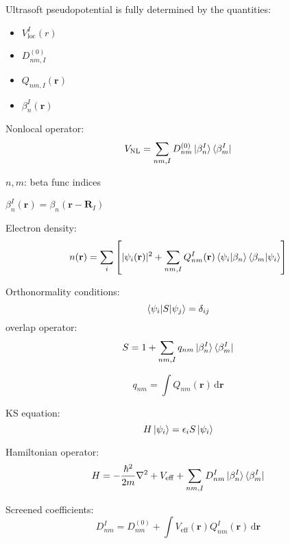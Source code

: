 \begin{frame}

Ultrasoft pseudopotential is fully determined by the quantities:
\begin{itemize}
\item $V^{I}_{\mathrm{loc}}(r)$
\item $D^{(0)}_{nm,I}$
\item $Q_{nm,I}(\mathbf{r})$
\item $\beta^{I}_{n}(\mathbf{r})$
\end{itemize}

Nonlocal operator:
\begin{equation*}
V_{\mathrm{NL}} = \sum_{nm,I} D^{(0)}_{nm} \ket{\beta^{I}_{n}}\bra{\beta^{I}_{m}}
\end{equation*}

$n,m$: beta func indices

$\beta^{I}_{n}(\mathbf{r}) = \beta_{n}(\mathbf{r} - \mathbf{R}_{I})$

Electron density:
\begin{equation*}
n(\mathbf{r}) = \sum_{i} \left[
| \psi_{i}(\mathbf{r}) |^{2} +
\sum_{nm,I} Q^{I}_{nm}(\mathbf{r}) \braket{ \psi_{i} | \beta_{n} }
\braket{ \beta_{m} | \psi_{i} }
\right]
\end{equation*}

\end{frame}


\begin{frame}

Orthonormality conditions:
\begin{equation*}
\braket{\psi_{i} | S | \psi_{j} } = \delta_{ij}
\end{equation*}
overlap operator:
\begin{equation*}
S = 1 + \sum_{nm,I} q_{nm} \ket{\beta^{I}_{n}} \bra{\beta^{I}_{m}}
\end{equation*}

\begin{equation*}
q_{nm} = \int Q_{nm}(\mathbf{r})\,\mathrm{d}\mathbf{r}
\end{equation*}

\end{frame}



\begin{frame} %

KS equation:
\begin{equation*}
H\ket{\psi_{i}} = \epsilon_{i} S \ket{\psi_{i}}
\end{equation*}

Hamiltonian operator:
\begin{equation*}
H = -\frac{\hbar^2}{2m} \nabla^2 + V_{\mathrm{eff}} +
\sum_{nm,I} D^{I}_{nm} \ket{\beta^{I}_{n}} \bra{\beta^{I}_{m}}
\end{equation*}

Screened coefficients:
\begin{equation*}
D^{I}_{nm} = D^{(0)}_{nm} + \int V_{\mathrm{eff}}(\mathbf{r})
Q^{I}_{nm}(\mathbf{r})\,\mathrm{d}\mathbf{r}
\end{equation*}

\end{frame}